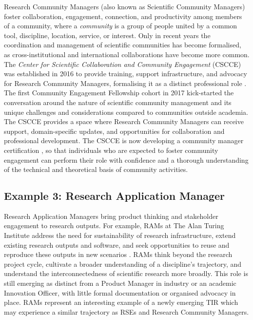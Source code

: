 \documentclass[authordate,meta,issue]{jote-new-article}
\begin{document}
Research Community Managers (also known as Scientific Community Managers) foster collaboration, engagement, connection, and productivity among members of a community, where a \emph{community }is a group of people united by a common tool, discipline, location, service, or interest. Only in recent years the coordination and management of scientific communities has become formalised, as cross-institutional and international collaborations have become more common. The \emph{Center for Scientific Collaboration and Community Engagement} (CSCCE) was established in 2016 to provide training, support infrastructure, and advocacy for Research Community Managers, formalising it as a distinct professional role \parencites{CSCCE2022}. The first Community Engagement Fellowship cohort in 2017 kick-started the conversation around the nature of scientific community management and its unique challenges and considerations compared to communities outside academia. The CSCCE provides a space where Research Community Managers can receive support, domain-specific updates, and opportunities for collaboration and professional development. The CSCCE is now developing a community manager certification \parencites{CSCCE2022a}, so that individuals who are expected to foster community engagement can perform their role with confidence and a thorough understanding of the technical and theoretical basis of community activities.



\subsection{Example 3: Research Application Manager}



Research Application Managers \parencites[RAMs;][]{TheTuringWayCommunityRecord2022a} bring product thinking and stakeholder engagement to research outputs. For example, RAMs at The Alan Turing Institute address the need for sustainability of research infrastructure, extend existing research outputs and software, and seek opportunities to reuse and reproduce these outputs in new scenarios \parencites{TheTuringWayCommunityRecord2022a}. RAMs think beyond the research project cycle, cultivate a broader understanding of a discipline's trajectory, and understand the interconnectedness of scientific research more broadly. This role is still emerging as distinct from a Product Manager in industry or an academic Innovation Officer, with little formal documentation or organised advocacy in place. RAMs represent an interesting example of a newly emerging TIR which may experience a similar trajectory as RSEs and Research Community Managers.
\end{document}
